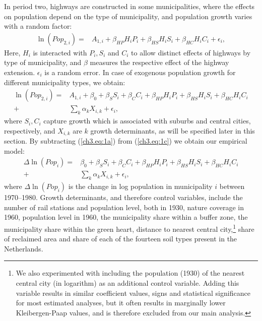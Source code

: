 \documentclass[a4paper,authoryear,review]{elsarticle}  	%
\begin{document}
	In period two, highways are constructed in some municipalities, where the effects on population depend on the type of municipality, and population growth varies with a random factor:	
	\begin{equation}\label{ch3.eq:1b}
		\begin{split}
			\ln(Pop_{2,i}) =& A_{1,i} + \beta_{HP}H_{i}P_{i} + \beta_{HS}H_{i}S_{i} + \beta_{HC}H_{i}C_{i} + \epsilon_i,
		\end{split}
	\end{equation}
	Here, $H_i$ is interacted with $P_i, S_i$ and $C_i$ to allow distinct effects of highways by type of municipality, and $\beta$ measures the respective effect of the highway extension. $\epsilon_i$ is a random error. In case of exogenous population growth for different municipality types, we obtain:			
	\begin{equation}\label{ch3.eq:1c}
	\begin{split}
	\ln(Pop_{2,i}) =& A_{1,i} + \beta_0+\beta_{S}S_i + \beta_{C}C_i + \beta_{HP}H_{i}P_{i} + \beta_{HS}H_{i}S_{i} + \beta_{HC}H_{i}C_{i} \\
	+ &\sum_{k}\alpha_{k} X_{i,k} + \epsilon_i ,
	\end{split}
	\end{equation}
	where $S_i, C_i$ capture growth which is associated with suburbs and central cities, respectively, and $X_{i,k}$ are $k$ growth determinants, as will be specified later in this section. By subtracting (\ref{ch3.eq:1a}) from (\ref{ch3.eq:1c}) we obtain our empirical model:	
	\begin{equation}\label{ch3.eq:1}
	\begin{split}
		\Delta\ln(Pop_i) =& \beta_0+\beta_{S}S_i + \beta_{C}C_i + \beta_{HP}H_{i}P_{i} + \beta_{HS}H_{i}S_{i} + \beta_{HC}H_{i}C_{i} \\
		+ &\sum_{k}\alpha_{k} X_{i,k} + \epsilon_i ,
	\end{split}
	\end{equation}	
	where $\Delta\ln(Pop_i)$ is the change in log population in municipality $i$ between 1970--1980. Growth determinants, and therefore control variables, include the number of rail stations and population level, both in 1930, nature coverage in 1960, population level in 1960, the municipality share within a buffer zone, the municipality share within the green heart, distance to nearest central city,\footnote{We also experimented with including the population (1930) of the nearest central city (in logarithm) as an additional control variable. Adding this variable results in similar coefficient values, signs and statistical significance for most estimated analyses, but it often results in marginally lower Kleibergen-Paap values, and is therefore excluded from our main analysis.} share of reclaimed area and share of each of the fourteen soil types present in the Netherlands. 
	 
\end{document}
